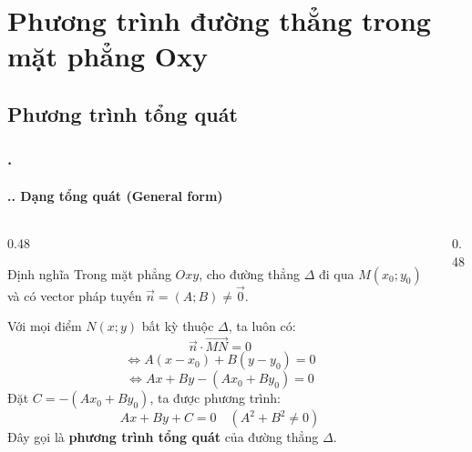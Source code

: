 \documentclass[11pt, aspectratio=169]{beamer}
\begin{document}
\section{Phương trình đường thẳng trong mặt phẳng Oxy}

\subsection{Phương trình tổng quát}

\begin{frame}[fragile]
    \frametitle{\thesection. \insertsection}
    \framesubtitle{\thesection.\thesubsection. Dạng tổng quát (General form)}
    \vspace{-0.5cm}

    \begin{columns}[T, onlytextwidth]
        \begin{column}{0.48\textwidth}
            \begin{block}{Định nghĩa}
                \footnotesize
                Trong mặt phẳng $Oxy$, cho đường thẳng $\Delta$ đi qua $M(x_0; y_0)$ và có vector pháp tuyến $\vec{n} = (A; B) \neq \vec{0}$.
                
                Với mọi điểm $N(x; y)$ bất kỳ thuộc $\Delta$, ta luôn có:
                \[
                    \vec{n} \cdot \overrightarrow{MN} = 0
                \]
                \[
                    \Leftrightarrow A(x - x_0) + B(y - y_0) = 0
                \]
                \[
                    \Leftrightarrow Ax + By - (Ax_0 + By_0) = 0
                \]
                Đặt $C = -(Ax_0 + By_0)$, ta được phương trình:
                \[
                    \boxed{Ax + By + C = 0} \quad (A^2 + B^2 \neq 0)
                \]
                Đây gọi là \textbf{phương trình tổng quát} của đường thẳng $\Delta$.
            \end{block}
        \end{column}
        
        \begin{column}{0.48\textwidth}
            \centering
            \vspace{0.4cm} %
\end{column}
\end{columns}
\end{frame}
\end{document}

